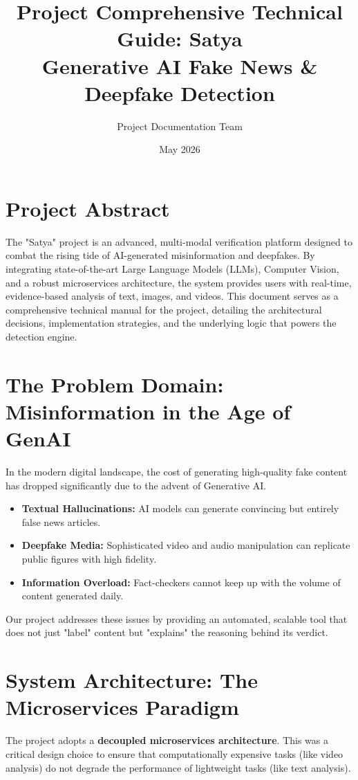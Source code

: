 \documentclass[12pt]{article}
\title{\textbf{Project Comprehensive Technical Guide: Satya \\ Generative AI Fake News \& Deepfake Detection}}
\author{Project Documentation Team}
\date{May 2026}
\begin{document}
\maketitle

\tableofcontents
\newpage

\section{Project Abstract}
The "Satya" project is an advanced, multi-modal verification platform designed to combat the rising tide of AI-generated misinformation and deepfakes. By integrating state-of-the-art Large Language Models (LLMs), Computer Vision, and a robust microservices architecture, the system provides users with real-time, evidence-based analysis of text, images, and videos. This document serves as a comprehensive technical manual for the project, detailing the architectural decisions, implementation strategies, and the underlying logic that powers the detection engine.

\section{The Problem Domain: Misinformation in the Age of GenAI}
In the modern digital landscape, the cost of generating high-quality fake content has dropped significantly due to the advent of Generative AI. 
\begin{itemize}
    \item \textbf{Textual Hallucinations:} AI models can generate convincing but entirely false news articles.
    \item \textbf{Deepfake Media:} Sophisticated video and audio manipulation can replicate public figures with high fidelity.
    \item \textbf{Information Overload:} Fact-checkers cannot keep up with the volume of content generated daily.
\end{itemize}
Our project addresses these issues by providing an automated, scalable tool that does not just "label" content but "explains" the reasoning behind its verdict.

\section{System Architecture: The Microservices Paradigm}
The project adopts a \textbf{decoupled microservices architecture}. This was a critical design choice to ensure that computationally expensive tasks (like video analysis) do not degrade the performance of lightweight tasks (like text analysis).
\end{document}
